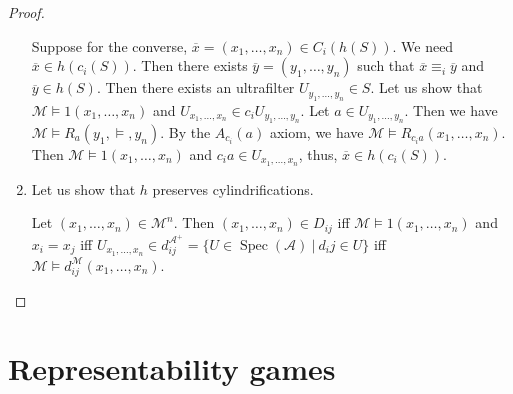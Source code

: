 \documentclass[a4paper]{article}
\theoremstyle{defin}
\theoremstyle{theorem}
\theoremstyle{claim}
\theoremstyle{prop}
\theoremstyle{lemma}
\theoremstyle{fact}
\theoremstyle{ex}
\theoremstyle{col}
\begin{document}
\begin{proof}
\begin{enumerate}
Suppose for the converse, $\overline{x} = (x_1, \dots, x_n) \in C_i (h(S))$. We need $\overline{x} \in h(c_i(S))$.
Then there exists $\overline{y} = (y_1, \dots, y_n)$ such that $\overline{x} \equiv_i \overline{y}$ and $\overline{y} \in h(S)$. Then there exists an ultrafilter $U_{y_1, \dots, y_n} \in S$. Let us show that $\mathcal{M} \models 1(x_1, \dots, x_n)$ and $U_{x_1, \dots, x_n} \in c_i U_{y_1, \dots, y_n}$.
Let $a \in U_{y_1, \dots, y_n}$. Then we have $\mathcal{M} \models R_a(y_1, \models, y_n)$. By the $A_{c_i}(a)$ axiom, we have $\mathcal{M} \models R_{c_i a}(x_1, \dots, x_n)$. Then $\mathcal{M} \models 1(x_1, \dots, x_n)$ and $c_i a \in U_{x_1, \dots, x_n}$, thus, $\overline{x} \in h(c_i(S))$.
\item Let us show that $h$ preserves cylindrifications.

Let $(x_1, \dots, x_n) \in \mathcal{M}^n$. Then $(x_1, \dots, x_n) \in D_{ij}$ iff $\mathcal{M} \models 1(x_1, \dots, x_n)$ and $x_i = x_j$ iff $U_{x_1, \dots, x_n} \in d_{ij}^{\mathcal{A}^{+}} = \{ U \in \operatorname{Spec}(\mathcal{A}) \: | \: d_ij \in U \}$ iff $\mathcal{M} \models d_{ij}^{\mathcal{M}}(x_1, \dots, x_n)$.
\end{enumerate}
\end{proof}

\section{Representability games}



\end{document}
